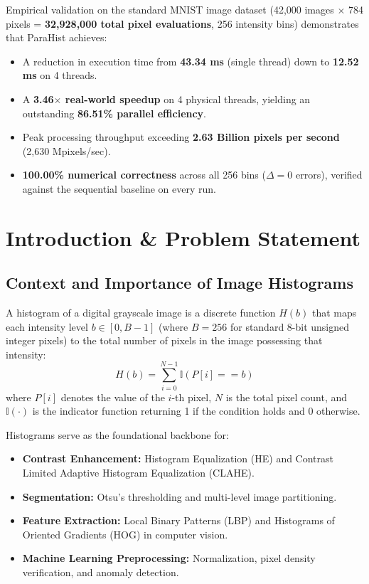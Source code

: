 \documentclass[12pt,a4paper,oneside]{report}
\begin{document}
Empirical validation on the standard MNIST image dataset (42,000 images $\times$ 784 pixels = \textbf{32,928,000 total pixel evaluations}, 256 intensity bins) demonstrates that ParaHist achieves:
\begin{itemize}
    \item A reduction in execution time from \textbf{43.34 ms} (single thread) down to \textbf{12.52 ms} on 4 threads.
    \item A \textbf{3.46$\times$ real-world speedup} on 4 physical threads, yielding an outstanding \textbf{86.51\% parallel efficiency}.
    \item Peak processing throughput exceeding \textbf{2.63 Billion pixels per second} (2,630 Mpixels/sec).
    \item \textbf{100.00\% numerical correctness} across all 256 bins ($\Delta = 0$ errors), verified against the sequential baseline on every run.
\end{itemize}

\clearpage
\tableofcontents
\clearpage
\listoffigures
\clearpage
\listoftables
\clearpage

\chapter{Introduction \& Problem Statement}

\section{Context and Importance of Image Histograms}
A histogram of a digital grayscale image is a discrete function $H(b)$ that maps each intensity level $b \in [0, B-1]$ (where $B=256$ for standard 8-bit unsigned integer pixels) to the total number of pixels in the image possessing that intensity:
\begin{equation}
    H(b) = \sum_{i=0}^{N-1} \mathbb{I}(P[i] == b)
\end{equation}
where $P[i]$ denotes the value of the $i$-th pixel, $N$ is the total pixel count, and $\mathbb{I}(\cdot)$ is the indicator function returning 1 if the condition holds and 0 otherwise.

Histograms serve as the foundational backbone for:
\begin{itemize}
    \item \textbf{Contrast Enhancement:} Histogram Equalization (HE) and Contrast Limited Adaptive Histogram Equalization (CLAHE).
    \item \textbf{Segmentation:} Otsu's thresholding and multi-level image partitioning.
    \item \textbf{Feature Extraction:} Local Binary Patterns (LBP) and Histograms of Oriented Gradients (HOG) in computer vision.
    \item \textbf{Machine Learning Preprocessing:} Normalization, pixel density verification, and anomaly detection.
\end{itemize}
\end{document}
